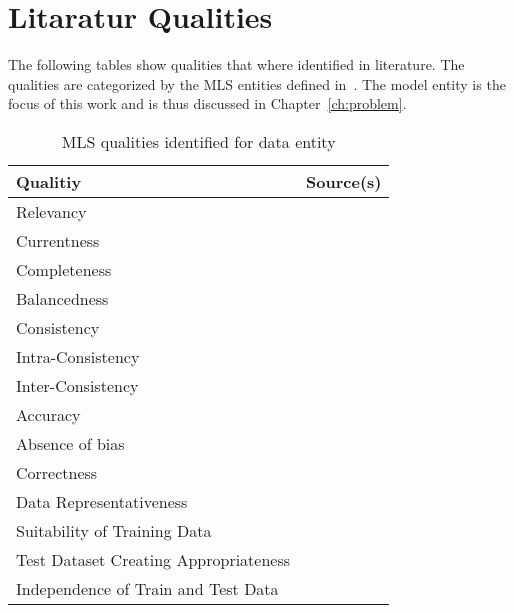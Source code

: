 \clearpage
%



\appendix
\chapter{Litaratur Qualities}

The following tables show qualities that where identified in literature.
The qualities are categorized by the \ac{MLS} entities defined in~\cite{siebert_construction_2021}.
The model entity is the focus of this work and is thus discussed in Chapter~\ref{ch:problem}.
\begin{table}[h]\label{tb:LiteratureQualitiesData}
    \centering\footnotesize
    \begin{tabular}{p{} p{}}
        \textbf{Qualitiy} & \textbf{Source(s)} \\
        \toprule
        Relevancy &~\cite{ashmore_assuring_2021} \\
        Currentness &~\cite{siebert_construction_2021} \\
        Completeness &~\cite{ashmore_assuring_2021, vogelsang_requirements_2019,
                            siebert_construction_2021} \\
        Balancedness &~\cite{ashmore_assuring_2021,siebert_construction_2021} \\
        Consistency &~\cite{vogelsang_requirements_2019} \\
        Intra-Consistency &~\cite{siebert_construction_2021} \\
        Inter-Consistency &~\cite{siebert_construction_2021} \\
        Accuracy &~\cite{ashmore_assuring_2021} \\
        Absence of bias &~\cite{siebert_construction_2021} \\
        Correctness &~\cite{vogelsang_requirements_2019} \\
        Data Representativeness &~\cite{nakamichi_requirements-driven_2020, siebert_construction_2021} \\
        Suitability of Training Data &~\cite{nakamichi_requirements-driven_2020} \\
        Test Dataset Creating Appropriateness &~\cite{nakamichi_requirements-driven_2020} \\
        Independence of Train and Test Data &~\cite{nakamichi_requirements-driven_2020,
                                                    siebert_construction_2021} \\
    \end{tabular}
    \caption{MLS qualities identified for data entity}
\end{table}

